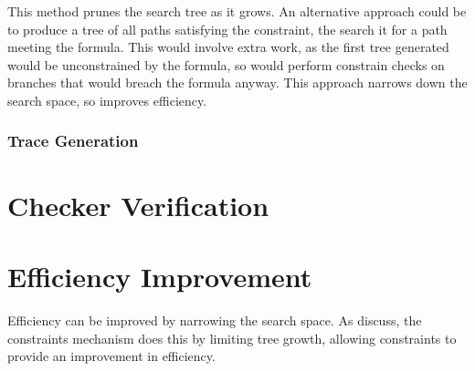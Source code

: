 \documentclass[a4paper,11pt]{article}
\begin{document}
	This method prunes the search tree as it grows. An alternative approach could be to produce a tree of all paths satisfying the constraint, the search it for a path meeting the formula. This would involve extra work, as the first tree generated would be unconstrained by the formula, so would perform constrain checks on branches that would breach the formula anyway. This approach narrows down the search space, so improves efficiency.
	
	\subsubsection{Trace Generation}
	
	\section{Checker Verification}
	
	\section{Efficiency Improvement}
	Efficiency can be improved by narrowing the search space. As discuss, the constraints mechanism does this by limiting tree growth, allowing constraints to provide an improvement in efficiency.
	
	\pagebreak
	\begin{thebibliography}{9}
		
		
		
		
		
	\end{thebibliography}
\end{document}
